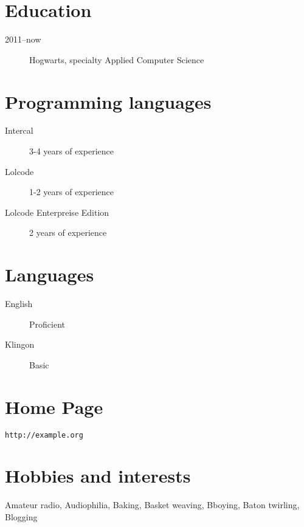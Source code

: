 \documentclass[a4paper,12pt]{cv}
\begin{document}
\section{Education}

\begin{description}
   \item[2011--now]{Hogwarts, specialty Applied Computer Science}
\end{description}


\section{Programming languages}

\begin{description}
   \item[Intercal]{3-4 years of experience}
   \item[Lolcode]{1-2 years of experience}
   \item[Lolcode Enterpreise Edition]{2 years of experience}
\end{description}


\section{Languages}
\begin{description}
   \item[English]{Proficient}
   \item[Klingon]{Basic}
\end{description}


\section{Home Page}
\texttt{http://example.org}


\section{Hobbies and interests}
Amateur radio, Audiophilia, Baking, Basket weaving, Bboying, Baton twirling, Blogging

\end{document}
